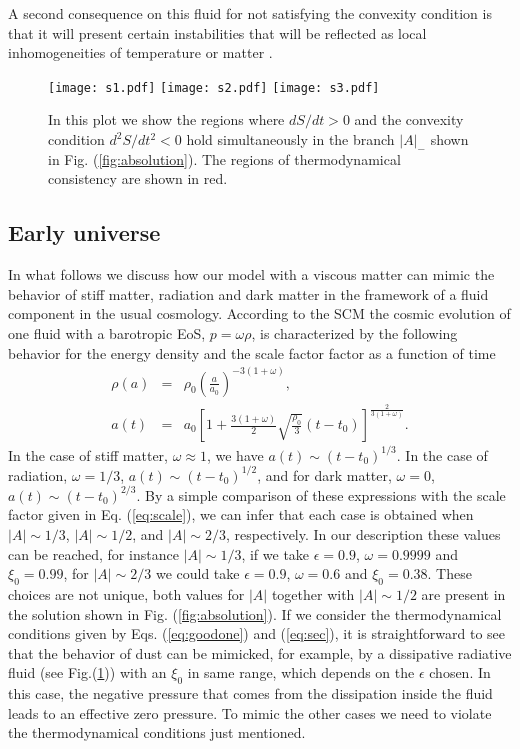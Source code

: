 \documentclass[twocolumn,showpacs,nofootinbib,floats,amsmath,amssymb]{revtex4}
\begin{document}
A second consequence on this fluid for not satisfying the convexity condition is that it will present certain instabilities that will be reflected as local inhomogeneities of temperature or matter \cite{callen}.\\
\begin{figure}[htbp!]
\centering
\texttt{[image: s1.pdf]}
\texttt{[image: s2.pdf]}
\texttt{[image: s3.pdf]}
\caption{In this plot we show the regions where $dS/dt > 0$ and the convexity condition $d^{2}S/dt^{2} < 0$ hold simultaneously in the branch $\left|A\right|_{-}$ shown in Fig. (\ref{fig:absolution}). The regions of thermodynamical consistency are shown in red.} 
\label{fig:entropy}
\end{figure}

\subsection{Early universe} 
In what follows we discuss how our model with a viscous matter can mimic the behavior of stiff matter, radiation and dark matter in the framework of a fluid component in the usual cosmology. According to
the SCM the cosmic evolution of one fluid with a barotropic EoS, $p=\omega\rho$, is characterized by the following behavior for the energy density and the scale factor factor as a function of time
\begin{eqnarray}
\rho(a) &=& \rho_{0}\left(\frac{a}{a_{0}} \right)^{-3(1+\omega)},\\
a(t) &=& a_{0}\left[1+\frac{3(1+\omega)}{2}\sqrt{\frac{\rho_{0}}{3}}(t-t_{0}) \right]^{\frac{2}{3(1+\omega)}}.
\end{eqnarray}
In the case of stiff matter, $\omega \approx 1$, we have $ a(t) \sim (t-t_{0})^{1/3}$. In the case of radiation, $\omega= 1/3$, $ a(t) \sim(t -t_{0})^{1/2}$, and for dark matter, $\omega= 0$, $ a(t) \sim (t
-t_{0})^{2/3}$. By a simple comparison of these expressions with the scale factor given in Eq. (\ref{eq:scale}), we can infer that each case is obtained when $|A| \sim 1/3$, $|A| \sim 1/2$, and $|A| \sim 2/3$, respectively. In our description these values can be reached, for instance $|A| \sim 1/3$, if we take $\epsilon = 0.9$, $\omega = 0.9999$ and $\xi_{0} = 0.99$, for $|A| \sim 2/3$ we could take $\epsilon = 0.9$,  $\omega = 0.6$ and $\xi_{0} = 0.38$. These choices are not unique, both values for $|A|$ together with $|A| \sim 1/2$ are present in the solution shown in Fig. (\ref{fig:absolution}). If we consider the thermodynamical conditions given by Eqs. (\ref{eq:goodone}) and (\ref{eq:sec}), it is straightforward to see that the behavior of dust can be mimicked, for example, by a dissipative radiative fluid (see Fig.(\ref{fig:entropy})) with an $\xi_{0}$ in same range, which depends on the $\epsilon$ chosen. In this case, the negative pressure that comes from the dissipation inside the fluid leads to an effective zero pressure. To mimic the other cases we need to violate the thermodynamical conditions just mentioned.
\end{document}
